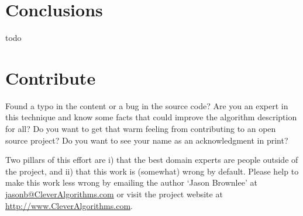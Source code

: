 \documentclass[a4paper, 11pt]{article}
\makeatletter
\newcommand{\myreportauthor}{Jason Brownlee}
\newcommand{\myreportemail}{jasonb@CleverAlgorithms.com}
\newcommand{\myreportwebsite}{http://www.CleverAlgorithms.com}
\makeatother
\begin{document}
% 
% 
\section{Conclusions}
\label{sec:conclusions}
todo

% 
% 
\section{Contribute}
\label{sec:contribute}
Found a typo in the content or a bug in the source code? 
Are you an expert in this technique and know some facts that could improve the algorithm description for all?
Do you want to get that warm feeling from contributing to an open source project? 
Do you want to see your name as an acknowledgment in print?

Two pillars of this effort are i) that the best domain experts are people outside of the project, and ii) that this work is (somewhat) wrong by default. 
Please help to make this work less wrong by emailing the author `\myreportauthor' at \url{\myreportemail} or visit the project website at \url{\myreportwebsite}.



\end{document}
